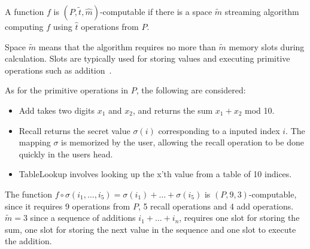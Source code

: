 \begin{definition}
    \label{ptm-computable}
    A function $f$ is $(P, \tilde t, \hat m)$-computable if there is a space $\tilde m$ streaming algorithm computing $f$ using $\hat t$ operations from $P$.
\end{definition}
\begin{remark}
    Space $\tilde m$ means that the algorithm requires no more than $\tilde m$ memory slots during calculation. Slots are typically used for storing values and executing primitive operations such as addition~\cite{space-complexity}.
\end{remark}



\noindent As for the primitive operations in $P$, the following are considered:
\begin{itemize}
    \item{Add} takes two digits $x_1$ and $x_2$, and returns the sum $x_1 + x_2$ mod 10.
    \item{Recall} returns the secret value $\sigma(i)$ corresponding to a inputed index $i$. The mapping $\sigma$ is memorized by the user, allowing the recall operation to be done quickly in the users head.
    \item{TableLookup} involves looking up the x'th value from a table of 10 indices.
\end{itemize}

\begin{example}
    The function $f \circ \sigma(i_1,\dots,i_5) = \sigma(i_1) + \dots + \sigma(i_5)$ is $(P,9,3)$-computable, since it requires 9 operations from $P$, 5 recall operations and 4 add operations. $\tilde m=3$ since a sequence of additions $i_1 + \dots + i_n$, requires one slot for storing the sum, one slot for storing the next value in the sequence and one slot to execute the addition.
\end{example}


